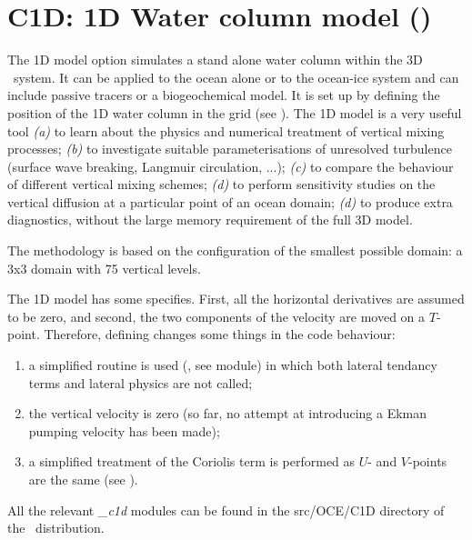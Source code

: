 \documentclass[../main/NEMO_manual]{subfiles}
\begin{document}
\section[C1D: 1D Water column model (\texttt{\textbf{key\_c1d}})]{C1D: 1D Water column model (\protect{})}
\label{sec:CFGS_c1d}

The 1D model option simulates a stand alone water column within the 3D \NEMO\ system.
It can be applied to the ocean alone or to the ocean-ice system and can include passive tracers or a biogeochemical model.
It is set up by defining the position of the 1D water column in the grid
(see ).
The 1D model is a very useful tool
\textit{(a)} to learn about the physics and numerical treatment of vertical mixing processes;
\textit{(b)} to investigate suitable parameterisations of unresolved turbulence
(surface wave breaking, Langmuir circulation, ...);
\textit{(c)} to compare the behaviour of different vertical mixing schemes;
\textit{(d)} to perform sensitivity studies on the vertical diffusion at a particular point of an ocean domain;
\textit{(d)} to produce extra diagnostics, without the large memory requirement of the full 3D model.

The methodology is based on the configuration of the smallest possible domain:
a 3x3 domain with 75 vertical levels.

The 1D model has some specifies. First, all the horizontal derivatives are assumed to be zero,
and second, the two components of the velocity are moved on a $T$-point.
Therefore, defining  changes some things in the code behaviour:
\begin{enumerate}
\item a simplified  routine is used (, see  module) in which
  both lateral tendancy terms and lateral physics are not called;
\item the vertical velocity is zero
  (so far, no attempt at introducing a Ekman pumping velocity has been made);
\item a simplified treatment of the Coriolis term is performed as $U$- and $V$-points are the same
  (see ).
\end{enumerate}
All the relevant \textit{\_c1d} modules can be found in the src/OCE/C1D directory of
the \NEMO\ distribution.


\end{document}
